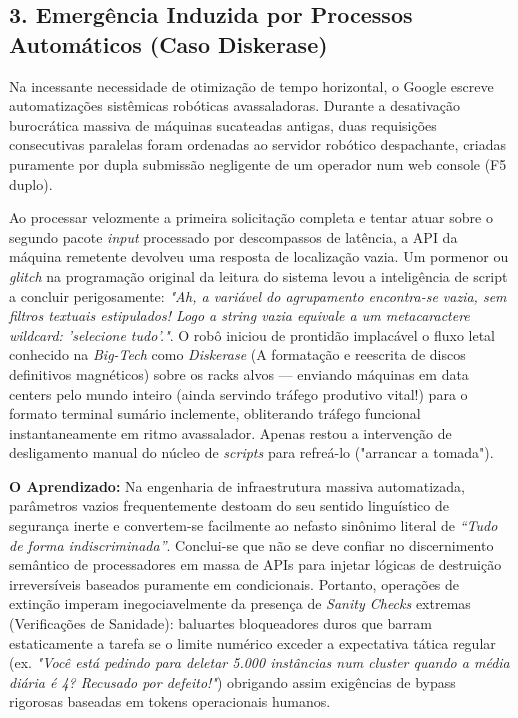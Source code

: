 \documentclass[12pt,a4paper,twoside]{report}
\begin{document}
\subsection{3. Emergência Induzida por Processos Automáticos (Caso Diskerase)}
Na incessante necessidade de otimização de tempo horizontal, o Google escreve automatizações sistêmicas robóticas avassaladoras. Durante a desativação burocrática massiva de máquinas sucateadas antigas, duas requisições consecutivas paralelas foram ordenadas ao servidor robótico despachante, criadas puramente por dupla submissão negligente de um operador num web console (F5 duplo).

Ao processar velozmente a primeira solicitação completa e tentar atuar sobre o segundo pacote \textit{input} processado por descompassos de latência, a API da máquina remetente devolveu uma resposta de localização vazia. Um pormenor ou \textit{glitch} na programação original da leitura do sistema levou a inteligência de script a concluir perigosamente: \textit{"Ah, a variável do agrupamento encontra-se vazia, sem filtros textuais estipulados! Logo a string vazia equivale a um metacaractere \textit{wildcard}: 'selecione tudo'."}.
O robô iniciou de prontidão implacável o fluxo letal conhecido na \textit{Big-Tech} como \textit{Diskerase} (A formatação e reescrita de discos definitivos magnéticos) sobre os racks alvos — enviando máquinas em data centers pelo mundo inteiro (ainda servindo tráfego produtivo vital!)  para o formato terminal sumário inclemente, obliterando tráfego funcional instantaneamente em ritmo avassalador. Apenas restou a intervenção de desligamento manual do núcleo de \textit{scripts} para refreá-lo ("arrancar a tomada").

\textbf{O Aprendizado:} Na engenharia de infraestrutura massiva automatizada, parâmetros vazios frequentemente destoam do seu sentido linguístico de segurança inerte e convertem-se facilmente ao nefasto sinônimo literal de \textit{“Tudo de forma indiscriminada”}. Conclui-se que não se deve confiar no discernimento semântico de processadores em massa de APIs para injetar lógicas de destruição irreversíveis baseados puramente em condicionais. Portanto, operações de extinção imperam inegociavelmente da presença de \textit{Sanity Checks} extremas (Verificações de Sanidade): baluartes bloqueadores duros que barram estaticamente a tarefa se o limite numérico exceder a expectativa tática regular (ex. \textit{"Você está pedindo para deletar 5.000 instâncias num cluster quando a média diária é 4? Recusado por defeito!"}) obrigando assim exigências de bypass rigorosas baseadas em tokens operacionais humanos.
\end{document}
